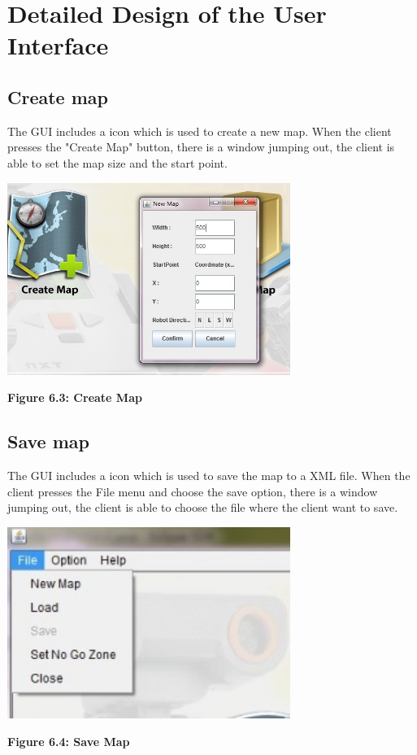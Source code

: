 \documentclass[11pt, a4paper]{report}
\begin{document}
\section{Detailed Design of the User Interface}
\subsection{Create map}
The GUI includes a icon which is used to create a new map. When the client presses the "Create Map"  button, there is a window jumping out, the client is able to set the map size and the start point.
\begin{center}
 \includegraphics[width=9.20cm]{CreateNewMap.jpg}
\end{center}
\begin{center}
\textbf {Figure 6.3: Create Map} \\[0.3cm]
\end{center}
\subsection{Save map}
The GUI includes a icon which is used to save the map to a XML file. When the client presses the File menu and choose the save option, there is a window jumping out, the client is able to choose the file where the client want to save.
\begin{center}
 \includegraphics[width=9.20cm]{Menu_file.jpg}
\end{center}
\begin{center}
\textbf {Figure 6.4: Save Map} \\[0.3cm]
\end{center}
\end{document}
